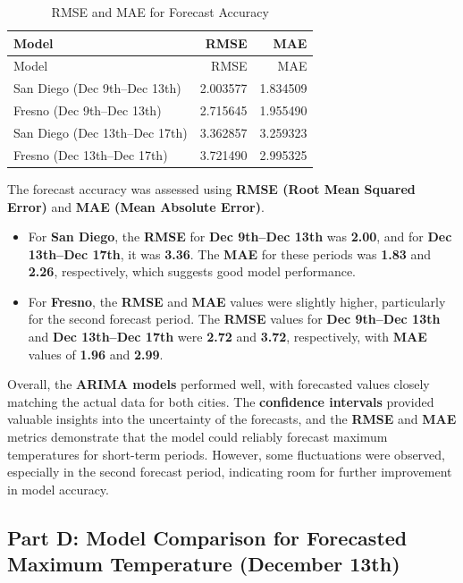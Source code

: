 \documentclass[
  11pt,
]{article}
\begin{document}
\begin{longtable}[]{@{}lrr@{}}
\caption{RMSE and MAE for Forecast Accuracy}\tabularnewline
\toprule\noalign{}
Model & RMSE & MAE \\
\midrule\noalign{}
\endfirsthead
\toprule\noalign{}
Model & RMSE & MAE \\
\midrule\noalign{}
\endhead
\bottomrule\noalign{}
\endlastfoot
San Diego (Dec 9th--Dec 13th) & 2.003577 & 1.834509 \\
Fresno (Dec 9th--Dec 13th) & 2.715645 & 1.955490 \\
San Diego (Dec 13th--Dec 17th) & 3.362857 & 3.259323 \\
Fresno (Dec 13th--Dec 17th) & 3.721490 & 2.995325 \\
\end{longtable}

The forecast accuracy was assessed using \textbf{RMSE (Root Mean Squared
Error)} and \textbf{MAE (Mean Absolute Error)}.

\begin{itemize}
\item
  For \textbf{San Diego}, the \textbf{RMSE} for \textbf{Dec 9th--Dec
  13th} was \textbf{2.00}, and for \textbf{Dec 13th--Dec 17th}, it was
  \textbf{3.36}. The \textbf{MAE} for these periods was \textbf{1.83}
  and \textbf{2.26}, respectively, which suggests good model
  performance.
\item
  For \textbf{Fresno}, the \textbf{RMSE} and \textbf{MAE} values were
  slightly higher, particularly for the second forecast period. The
  \textbf{RMSE} values for \textbf{Dec 9th--Dec 13th} and \textbf{Dec
  13th--Dec 17th} were \textbf{2.72} and \textbf{3.72}, respectively,
  with \textbf{MAE} values of \textbf{1.96} and \textbf{2.99}.
\end{itemize}

Overall, the \textbf{ARIMA models} performed well, with forecasted
values closely matching the actual data for both cities. The
\textbf{confidence intervals} provided valuable insights into the
uncertainty of the forecasts, and the \textbf{RMSE} and \textbf{MAE}
metrics demonstrate that the model could reliably forecast maximum
temperatures for short-term periods. However, some fluctuations were
observed, especially in the second forecast period, indicating room for
further improvement in model accuracy.

\subsection{Part D: Model Comparison for Forecasted Maximum Temperature
(December
13th)}\label{part-d-model-comparison-for-forecasted-maximum-temperature-december-13th}
\end{document}
